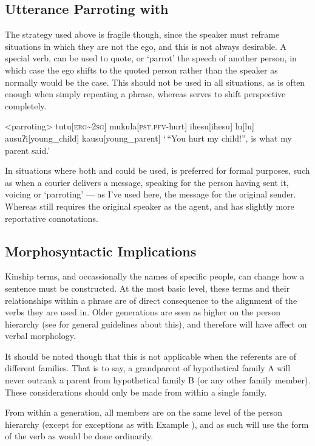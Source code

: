 \documentclass[openany, 12pt, b5paper, draft]{memoir}
\begin{document}
\subsection{Utterance Parroting with }
The strategy used above is fragile though, since the speaker must reframe situations in which they are not the ego, and this is not always desirable. A special verb,  can be used to quote, or `parrot' the speech of another person, in which case the ego shifts to the quoted person rather than the speaker as normally would be the case. This should not be used in all situations, as  is often enough when simply repeating a phrase, whereas  serves to shift perspective completely.

\ex<parroting>
\begingl
tutu[\textsc{erg\textasciitilde 2sg}]
mukula[\textsc{pst.pfv-}hurt]
ihesu[ihesu]
lu[lu]
ausuʔi[young\_child]
kausu[young\_parent]
\glft `\,``You hurt my child!'', is what my parent said.'
\endgl
\xe

In situations where both  and  could be used,  is preferred for formal purposes, such as when a courier delivers a message, speaking for the person having sent it, voicing or `parroting' --- as I've used here, the message for the original sender. Whereas  still requires the original speaker as the agent, and has slightly more reportative connotations.

\subsection{Morphosyntactic Implications}
Kinship terms, and occassionally the names of specific people, can change how a sentence must be constructed. At the most basic level, these terms and their relationships within a phrase are of direct consequence to the alignment of the verbs they are used in. Older generations are seen as higher on the person hierarchy (see  for general guidelines about this), and therefore will have affect on verbal morphology.

It should be noted though that this is not applicable when the referents are of different families. That is to say, a grandparent of hypothetical family A will never outrank a parent from hypothetical family B (or any other family member). These considerations should only be made from within a single family.

From within a generation, all members are on the same level of the person hierarchy (except for exceptions as with Example ), and as such will use the form of the verb as would be done ordinarily.
\end{document}
